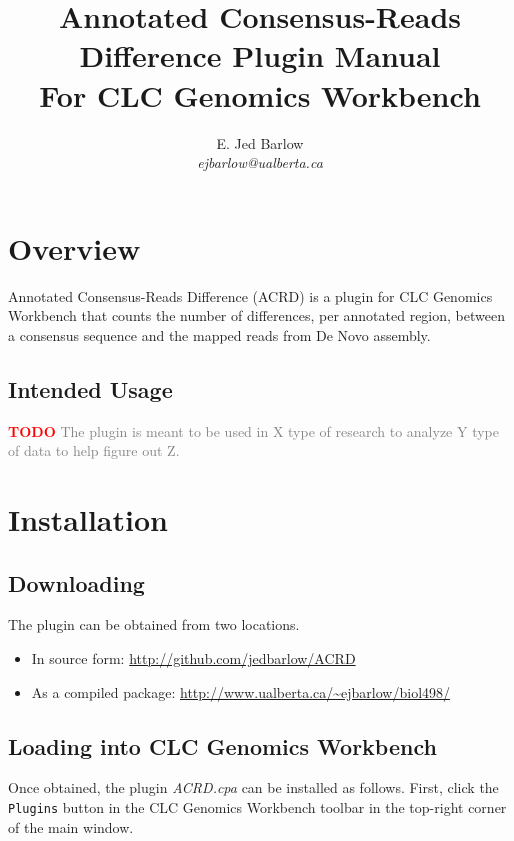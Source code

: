 \documentclass[12pt,letterpaper]{article}
\author{
    E. Jed Barlow\\
    \textit{ejbarlow@ualberta.ca}
}
\title{Annotated Consensus-Reads Difference Plugin Manual\\\small{For CLC Genomics Workbench}}
\begin{document}
\maketitle

\hfill

\tableofcontents

\newpage
\section{Overview}

Annotated Consensus-Reads Difference (ACRD) is a plugin for CLC Genomics
Workbench that counts the number of differences, per annotated region, between
a consensus sequence and the mapped reads from De Novo assembly.

\subsection{Intended Usage}

\textbf{\textcolor{red}{TODO}} \textcolor{gray}{The plugin is meant to be used
in X type of research to analyze Y type of data to help figure out Z.}

\section{Installation}

\subsection{Downloading}

The plugin can be obtained from two locations.

\begin{itemize}
\item
    In source form: \url{http://github.com/jedbarlow/ACRD}
\item
    As a compiled package: \url{http://www.ualberta.ca/~ejbarlow/biol498/}
\end{itemize}

\subsection{Loading into CLC Genomics Workbench}

Once obtained, the plugin \textit{ACRD.cpa} can be installed as
follows.  First, click the \texttt{Plugins} button in the CLC Genomics
Workbench toolbar in the top-right corner of the main window.
\end{document}
